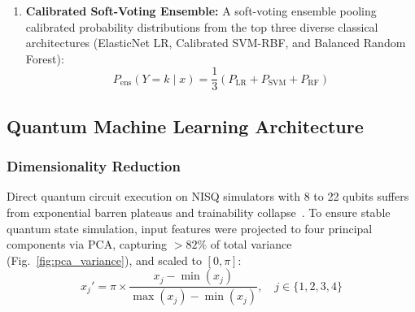 \documentclass[conference]{IEEEtran}
\begin{document}
\begin{enumerate}
    \begin{enumerate}
        \item Continuous Target Transformation: $z_i = \ln(\text{eGFR}_i)$;
        \item Linear Ridge Fit: $\hat{z}(x) = w^T x + b$;
        \item Exponential Reversion: $\widehat{\text{eGFR}} = \exp(\hat{z}(x))$;
        \item Deterministic Clinical Binning: Applying KDIGO cutoffs:
        \begin{equation}
        \hat{Y} = \begin{cases} 
        1 & \text{if } \widehat{\text{eGFR}} \ge 90 \\ 
        2 & \text{if } 60 \le \widehat{\text{eGFR}} < 90 \\ 
        3 & \text{if } 30 \le \widehat{\text{eGFR}} < 60 \\ 
        4 & \text{if } 15 \le \widehat{\text{eGFR}} < 30 \\ 
        5 & \text{if } \widehat{\text{eGFR}} < 15 
        \end{cases}
        \end{equation}
    \end{enumerate}
    \item \textbf{Calibrated Soft-Voting Ensemble:} A soft-voting ensemble pooling calibrated probability distributions from the top three diverse classical architectures (ElasticNet LR, Calibrated SVM-RBF, and Balanced Random Forest):
    \begin{equation}
    P_{\text{ens}}(Y = k \mid x) = \frac{1}{3} \left( P_{\text{LR}} + P_{\text{SVM}} + P_{\text{RF}} \right)
    \end{equation}
\end{enumerate}

\subsection{Quantum Machine Learning Architecture}

\subsubsection{Dimensionality Reduction}
Direct quantum circuit execution on NISQ simulators with 8 to 22 qubits suffers from exponential barren plateaus and trainability collapse~\cite{mcclean2018barren}. To ensure stable quantum state simulation, input features were projected to four principal components via PCA, capturing $> 82\%$ of total variance (Fig.~\ref{fig:pca_variance}), and scaled to $[0, \pi]$:
\begin{equation}
x_j' = \pi \times \frac{x_j - \min(x_j)}{\max(x_j) - \min(x_j)}, \quad j \in \{1, 2, 3, 4\}
\end{equation}
\end{document}
